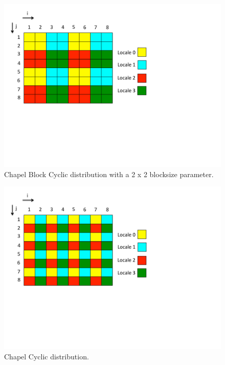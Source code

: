 \begin{figure}
	\begin{center}
	\includegraphics[scale=0.55]{./Figures/block_cyc_dist}
	\caption{Chapel Block Cyclic distribution with a 2 x 2 blocksize parameter.}
	\label{block_cyc_dist}
	\end{center}
\end{figure}

\begin{figure}
	\begin{center}
	\includegraphics[scale=0.55]{./Figures/cyc_dist}
	\caption{Chapel Cyclic distribution.}
	\label{cyc_dist}
	\end{center}
\end{figure}

